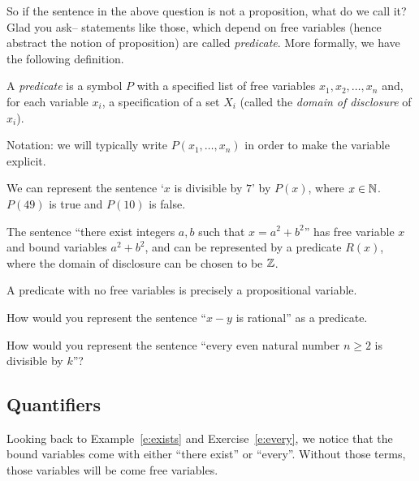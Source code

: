 So if the sentence in the above question is not a proposition, what do we call it?
Glad you ask-- statements like those, which depend on free variables (hence abstract
the notion of proposition) are called \emph{predicate}.
More formally, we have the following definition.

\begin{definition}
    A \emph{predicate} is a symbol $P$ with a specified list of free variables $x_1, x_2, \dots, x_n$ and, for each variable $x_i$, a specification of a set $X_i$ (called the \emph{domain of disclosure} of $x_i$).

    Notation: we will typically write $P(x_1,\dots, x_n)$ in order to make the variable
    explicit.
\end{definition}

\begin{example}
    We can represent the sentence `$x$ is divisible by $7$' by $P(x)$, where $x \in \mathbb{N}$.
    $P(49)$ is true and $P(10)$ is false.
\end{example}

\begin{example}
    \label{e:exists}
   The sentence ``there exist integers $a,b$ such that $x = a^2 + b^2$'' has free
   variable $x$ and bound variables $a^2+ b^2$, 
   and can be represented by a predicate $R(x)$, where the domain of disclosure 
   can be chosen to be $\mathbb{Z}$.
\end{example}

\begin{remark}
    A predicate with no free variables is precisely a propositional variable.
\end{remark}

\begin{exercise}
    How would you represent the sentence ``$x-y$ is rational'' as a predicate.
\end{exercise}

\begin{exercise}
    \label{e:every}
    How would you represent the sentence ``every even natural number $n\geq 2$ is
    divisible by $k$''?
\end{exercise}


\subsection{Quantifiers}
Looking back to Example~\ref{e:exists} and Exercise~\ref{e:every}, we notice that
the bound variables come with either ``there exist'' or ``every''.
Without those terms, those variables will be come free variables.

